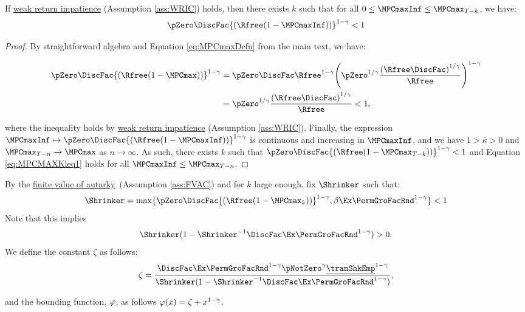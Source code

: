 \documentclass[\econtexRoot/BufferStockTheory]{subfiles}
\begin{document}
\begin{claim}\label{claim:MPCMAXKleq1}
If \hyperlink{WRIC}{weak return impatience} (Assumption \ref{ass:WRIC}) holds, then there exists $k$ such that for all $0\leq\MPCmaxInf\leq \MPCmax_{T-k}$, we have:
%
\begin{equation}\label{eq:MPCMAXKleq1}
  \pZero \DiscFac {(\Rfree (1-\MPCmaxInf))}^{1-\CRRA}   < 1
\end{equation}
%
\end{claim}
\begin{proof}

By straightforward algebra and Equation \eqref{eq:MPCmaxDefn} from the main text, we have:

\begin{equation}\begin{gathered}\begin{aligned}
\pZero \DiscFac {(\Rfree (1-\MPCmax))}^{1-\CRRA}  & = \pZero\DiscFac\Rfree^{1-\CRRA}{\left(\pZero^{1/\CRRA}\frac{{(\Rfree\DiscFac)}^{1/\CRRA}}{\Rfree}\right)}^{1-\CRRA} \\\notag
& = \pZero^{1/\CRRA}\frac{{(\Rfree\DiscFac)}^{1/\CRRA}}{\Rfree} <1 \notag,
\end{aligned}\end{gathered}\end{equation}

where the inequality holds by \hyperlink{WRIC}{weak return impatience} (Assumption \ref{ass:WRIC}).
Finally, the expression $\MPCmaxInf\mapsto \pZero \DiscFac {(\Rfree (1-\MPCmaxInf))}^{1-\CRRA} $ is continuous and increasing in $\MPCmaxInf$, and we have $1>\bar{\kappa}>0$ and $\MPCmax_{T-n} \rightarrow \MPCmax$ as $n\rightarrow\infty$.
As such, there exists $k$ such that $\pZero \DiscFac {(\Rfree (1-\MPCmax_{T-k}))}^{1-\CRRA}<1$ and Equation \eqref{eq:MPCMAXKleq1} holds for all $\MPCmaxInf\leq \MPCmax_{T-n}$.


\end{proof}


\begin{remark}\label{rem:shnkrdef}
By the \hyperlink{FVAC}{finite value of autarky}~(Assumption \ref{ass:FVAC}) and for $k$ large enough, fix $\Shrinker$ such that:
%
\begin{equation}\label{eq:shnkrdef}
\Shrinker = \max\{\pZero \DiscFac {(\Rfree (1-\MPCmax_{k}))}^{1-\CRRA},\beta\Ex\PermGroFacRnd^{1-\CRRA}\}<1
\end{equation}
%
Note that this implies
%
\begin{equation}\label{eq:shrnkrCond}
\Shrinker(1- \Shrinker^{-1}\DiscFac \Ex\PermGroFacRnd^{1-\CRRA })>0. 
\end{equation}
%
We define the constant $\zeta$ as follows:
%
\begin{equation}\label{eq:Mbarddef}
\zeta = \frac{\DiscFac \Ex \PermGroFacRnd^{1-\CRRA }\pNotZero^{\CRRA}\underline{\tranShkEmp}^{1-\CRRA}}{\Shrinker(1- \Shrinker^{-1}\DiscFac \Ex \PermGroFacRnd^{1-\CRRA })}, 
\end{equation}

and the bounding function, $\varphi$, as follows $\varphi(x) = \zeta +  x^{1-\gamma}$.


\end{remark}
\end{document}
